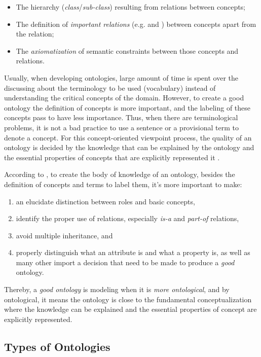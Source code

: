 \begin{itemize}
\item The hierarchy (\emph{class}/\emph{sub-class}) resulting from  relations between concepts;
\item The definition of \emph{important relations} (e.g.  and ) between concepts apart from the  relation;
\item The \emph{axiomatization} of semantic constraints between those concepts and relations.
\end{itemize}

Usually, when developing ontologies, large amount of time is spent over the discussing about the terminology to be used (vocabulary) instead of understanding the critical concepts of the domain.
However, to create a good ontology the definition of concepts is more important, and the labeling of these concepts pass to have less importance.
Thus, when there are terminological problems, it is not a bad practice to use a sentence or a provisional term to denote a concept.
For this concept-oriented viewpoint process, the quality of an ontology is decided by the knowledge that can be explained by the ontology and the essential properties of concepts that are explicitly represented it \cite{Mizoguchi2004}.

According to , to create the body of knowledge of an ontology, besides the definition of concepts and terms to label them, it's more important to make: 
\begin{enumerate}%
\item an elucidate distinction between roles and basic concepts,
\item identify the proper use of relations, especially \emph{is-a} and \emph{part-of} relations,
\item avoid multiple inheritance, and
\item properly distinguish what an attribute is and what a property is, as well as many other import a decision that need to be made to produce a \emph{good} ontology.
\end{enumerate}

Thereby, a \emph{good ontology} is modeling when it is \emph{more ontological}, and by ontological, it means the ontology is close to the fundamental conceptualization where the knowledge can be explained and the essential properties of concept are explicitly represented.

\subsection{Types of Ontologies}
\label{subsec:types-otologies}

